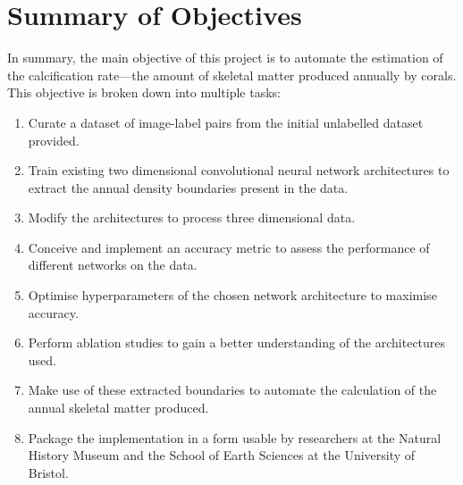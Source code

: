 


\section{Summary of Objectives}

In summary, the main objective of this project is to automate the estimation of the calcification rate---the amount of skeletal matter produced annually by corals. This objective is broken down into multiple tasks:

\begin{enumerate}
    \item Curate a dataset of image-label pairs from the initial unlabelled dataset provided.
    \item Train existing two dimensional convolutional neural network architectures to extract the annual density boundaries present in the data.
    \item Modify the architectures to process three dimensional data.
    \item Conceive and implement an accuracy metric to assess the performance of different networks on the data.
    \item Optimise hyperparameters of the chosen network architecture to maximise accuracy.
    \item Perform ablation studies to gain a better understanding of the architectures used.
    \item Make use of these extracted boundaries to automate the calculation of the annual skeletal matter produced.
    \item Package the implementation in a form usable by researchers at the Natural History Museum and the School of Earth Sciences at the University of Bristol.
\end{enumerate}
